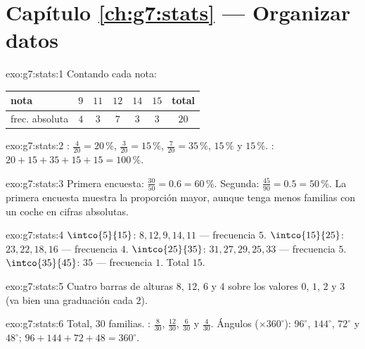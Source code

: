 \section*{Capítulo \ref{ch:g7:stats} --- Organizar datos}

\begin{solution}{exo:g7:stats:1}
Contando cada nota:
\begin{center}
\renewcommand{\arraystretch}{1.2}
\begin{tabular}{l|ccccc|c}
nota & $9$ & $11$ & $12$ & $14$ & $15$ & total \\
\hline
frec. absoluta & $4$ & $3$ & $7$ & $3$ & $3$ & $20$ \\
\end{tabular}
\end{center}
\end{solution}

\begin{solution}{exo:g7:stats:2}
: $\frac{4}{20} = 20\,\%$, $\frac{3}{20} = 15\,\%$,
$\frac{7}{20} = 35\,\%$, $15\,\%$ y $15\,\%$. :
$20 + 15 + 35 + 15 + 15 = 100\,\%$. \checkmark
\end{solution}

\begin{solution}{exo:g7:stats:3}
Primera encuesta: $\frac{30}{50} = 0.6 = 60\,\%$. Segunda:
$\frac{45}{90} = 0.5 = 50\,\%$. La primera encuesta muestra la proporción
mayor, aunque tenga menos familias con un coche en cifras
absolutas.
\end{solution}

\begin{solution}{exo:g7:stats:4}
$\intco{5}{15}$: $8, 12, 9, 14, 11$ --- frecuencia $5$.
$\intco{15}{25}$: $23, 22, 18, 16$ --- frecuencia $4$.
$\intco{25}{35}$: $31, 27, 29, 25, 33$ --- frecuencia $5$.
$\intco{35}{45}$: $35$ --- frecuencia $1$. Total $15$. \checkmark
\end{solution}

\begin{solution}{exo:g7:stats:5}
Cuatro barras de alturas $8$, $12$, $6$ y $4$ sobre los valores $0$, $1$,
$2$ y $3$ (va bien una graduación cada $2$).
\end{solution}

\begin{solution}{exo:g7:stats:6}
Total, $30$ familias. : $\frac{8}{30}$, $\frac{12}{30}$,
$\frac{6}{30}$ y $\frac{4}{30}$. Ángulos ($\times 360^\circ$): $96^\circ$,
$144^\circ$, $72^\circ$ y $48^\circ$; 
$96 + 144 + 72 + 48 = 360^\circ$. \checkmark
\end{solution}

